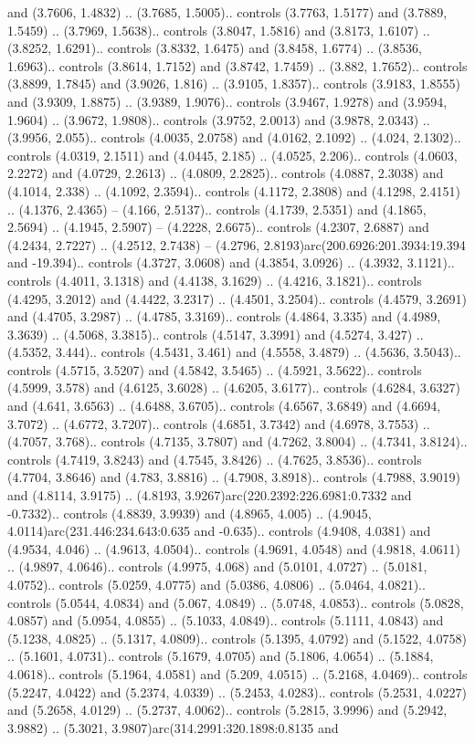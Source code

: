 and (3.7606, 1.4832) .. (3.7685, 1.5005).. controls (3.7763, 1.5177) and (3.7889, 1.5459) .. (3.7969, 1.5638).. controls (3.8047, 1.5816) and (3.8173, 1.6107) .. (3.8252, 1.6291).. controls (3.8332, 1.6475) and (3.8458, 1.6774) .. (3.8536, 1.6963).. controls (3.8614, 1.7152) and (3.8742, 1.7459) .. (3.882, 1.7652).. controls (3.8899, 1.7845) and (3.9026, 1.816) .. (3.9105, 1.8357).. controls (3.9183, 1.8555) and (3.9309, 1.8875) .. (3.9389, 1.9076).. controls (3.9467, 1.9278) and (3.9594, 1.9604) .. (3.9672, 1.9808).. controls (3.9752, 2.0013) and (3.9878, 2.0343) .. (3.9956, 2.055).. controls (4.0035, 2.0758) and (4.0162, 2.1092) .. (4.024, 2.1302).. controls (4.0319, 2.1511) and (4.0445, 2.185) .. (4.0525, 2.206).. controls (4.0603, 2.2272) and (4.0729, 2.2613) .. (4.0809, 2.2825).. controls (4.0887, 2.3038) and (4.1014, 2.338) .. (4.1092, 2.3594).. controls (4.1172, 2.3808) and (4.1298, 2.4151) .. (4.1376, 2.4365) -- (4.166, 2.5137).. controls (4.1739, 2.5351) and (4.1865, 2.5694) .. (4.1945, 2.5907) -- (4.2228, 2.6675).. controls (4.2307, 2.6887) and (4.2434, 2.7227) .. (4.2512, 2.7438) -- (4.2796, 2.8193)arc(200.6926:201.3934:19.394 and -19.394).. controls (4.3727, 3.0608) and (4.3854, 3.0926) .. (4.3932, 3.1121).. controls (4.4011, 3.1318) and (4.4138, 3.1629) .. (4.4216, 3.1821).. controls (4.4295, 3.2012) and (4.4422, 3.2317) .. (4.4501, 3.2504).. controls (4.4579, 3.2691) and (4.4705, 3.2987) .. (4.4785, 3.3169).. controls (4.4864, 3.335) and (4.4989, 3.3639) .. (4.5068, 3.3815).. controls (4.5147, 3.3991) and (4.5274, 3.427) .. (4.5352, 3.444).. controls (4.5431, 3.461) and (4.5558, 3.4879) .. (4.5636, 3.5043).. controls (4.5715, 3.5207) and (4.5842, 3.5465) .. (4.5921, 3.5622).. controls (4.5999, 3.578) and (4.6125, 3.6028) .. (4.6205, 3.6177).. controls (4.6284, 3.6327) and (4.641, 3.6563) .. (4.6488, 3.6705).. controls (4.6567, 3.6849) and (4.6694, 3.7072) .. (4.6772, 3.7207).. controls (4.6851, 3.7342) and (4.6978, 3.7553) .. (4.7057, 3.768).. controls (4.7135, 3.7807) and (4.7262, 3.8004) .. (4.7341, 3.8124).. controls (4.7419, 3.8243) and (4.7545, 3.8426) .. (4.7625, 3.8536).. controls (4.7704, 3.8646) and (4.783, 3.8816) .. (4.7908, 3.8918).. controls (4.7988, 3.9019) and (4.8114, 3.9175) .. (4.8193, 3.9267)arc(220.2392:226.6981:0.7332 and -0.7332).. controls (4.8839, 3.9939) and (4.8965, 4.005) .. (4.9045, 4.0114)arc(231.446:234.643:0.635 and -0.635).. controls (4.9408, 4.0381) and (4.9534, 4.046) .. (4.9613, 4.0504).. controls (4.9691, 4.0548) and (4.9818, 4.0611) .. (4.9897, 4.0646).. controls (4.9975, 4.068) and (5.0101, 4.0727) .. (5.0181, 4.0752).. controls (5.0259, 4.0775) and (5.0386, 4.0806) .. (5.0464, 4.0821).. controls (5.0544, 4.0834) and (5.067, 4.0849) .. (5.0748, 4.0853).. controls (5.0828, 4.0857) and (5.0954, 4.0855) .. (5.1033, 4.0849).. controls (5.1111, 4.0843) and (5.1238, 4.0825) .. (5.1317, 4.0809).. controls (5.1395, 4.0792) and (5.1522, 4.0758) .. (5.1601, 4.0731).. controls (5.1679, 4.0705) and (5.1806, 4.0654) .. (5.1884, 4.0618).. controls (5.1964, 4.0581) and (5.209, 4.0515) .. (5.2168, 4.0469).. controls (5.2247, 4.0422) and (5.2374, 4.0339) .. (5.2453, 4.0283).. controls (5.2531, 4.0227) and (5.2658, 4.0129) .. (5.2737, 4.0062).. controls (5.2815, 3.9996) and (5.2942, 3.9882) .. (5.3021, 3.9807)arc(314.2991:320.1898:0.8135 and 